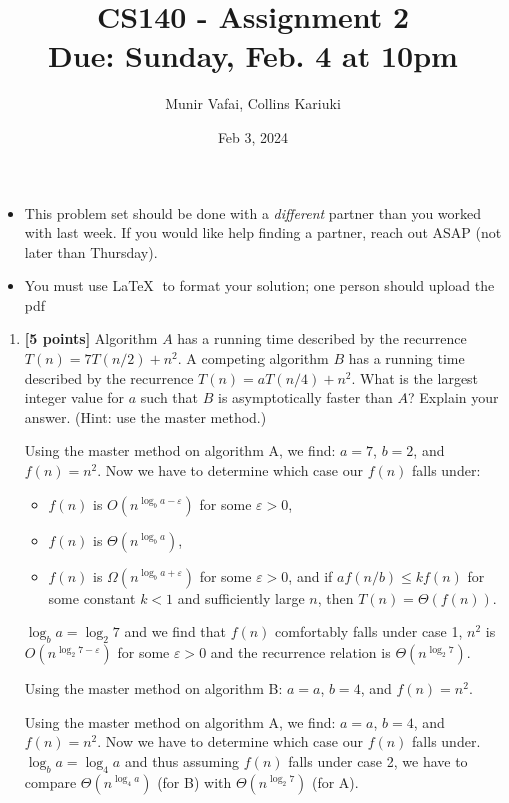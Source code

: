 \documentclass[11pt]{article}
\title{CS140 - Assignment 2\\\small{Due: Sunday,  Feb. 4 at 10pm}}
\author{Munir Vafai, Collins Kariuki}
\date{Feb 3, 2024}
\begin{document}
\maketitle



\begin{itemize}
\item[] This problem set should be done with a \emph{different} partner than you worked with last week.  If you would like help finding a partner, reach out ASAP (not later than Thursday).
\item[] You must use \LaTeX $\;$ to format your solution; one person should upload the pdf
\end{itemize}

\begin{enumerate}


\item \textbf{[5 points]} Algorithm $A$ has a running time described by the recurrence $T(n) = 7 T(n/2) + n^2$.  A competing algorithm $B$ has a running time described by the recurrence $T(n) = a T(n/4) + n^2$.  What is the largest integer value for $a$ such that $B$ is asymptotically faster than $A$?  Explain your answer.  (Hint: use the master method.)

Using the master method on algorithm A, we find: $a=7$, $b=2$, and $f(n)=n^2$. Now we have to determine which case our $f(n)$ falls under:

\begin{itemize}
    \item \( f(n) \) is \( O(n^{\log_b a - \varepsilon}) \) for some \( \varepsilon > 0 \),
    \item \( f(n) \) is \( \Theta(n^{\log_b a}) \),
    \item \( f(n) \) is \( \Omega(n^{\log_b a + \varepsilon}) \) for some \( \varepsilon > 0 \), and if \( a f(n/b) \leq k f(n) \) for some constant \( k < 1 \) and sufficiently large \( n \), then \( T(n) = \Theta(f(n)) \).
\end{itemize}

$\log_b a = \log_2 7$ and we find that $f(n)$ comfortably falls under case 1, $n^2$ is $O(n^{\log_2 7- \varepsilon})$ for some $\varepsilon > 0$ and the recurrence relation is $\Theta(n^{\log_2 7})$.

Using the master method on algorithm B: $a=a$, $b=4$, and $f(n)=n^2$.

Using the master method on algorithm A, we find: $a=a$, $b=4$, and $f(n)=n^2$. Now we have to determine which case our $f(n)$ falls under. $\log_b a=\log_4 a$ and thus assuming $f(n)$ falls under case 2, we have to compare $\Theta(n^{\log_4 a})$ (for B) with $\Theta(n^{\log_2 7})$ (for A).


\end{enumerate}
\end{document}
